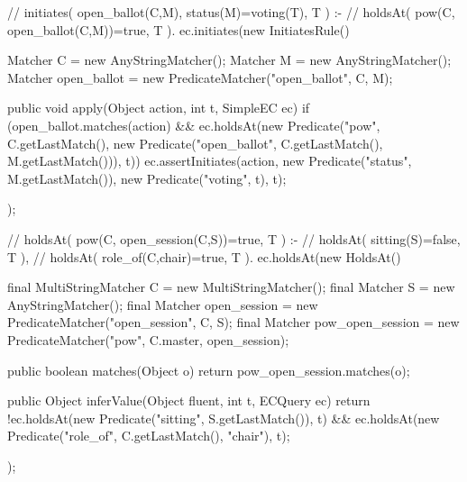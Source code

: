 \begin{java}[label=lst:initiates, caption={[Example of initiates rule]Example of initiates rule. Matchers are used to built a description of the event we wish to match. The matched arguments in this event are then used in the \emph{holdsAt} query to check whether the actor is empowered to perform the action. If the event and query are both valid we assert the change to the \emph{status} predicate.}]
// initiates( open_ballot(C,M), status(M)=voting(T), T ) :-
//     holdsAt( pow(C, open_ballot(C,M))=true, T ).
ec.initiates(new InitiatesRule() {
	Matcher C = new AnyStringMatcher();
	Matcher M = new AnyStringMatcher();
	Matcher open_ballot = new PredicateMatcher("open_ballot", C, M);

	public void apply(Object action, int t, SimpleEC ec) {
		if (open_ballot.matches(action)
				&& ec.holdsAt(new Predicate("pow", C.getLastMatch(),
						new Predicate("open_ballot", C.getLastMatch(),
								M.getLastMatch())), t)) {
			ec.assertInitiates(action,
					new Predicate("status", M.getLastMatch()),
					new Predicate("voting", t), t);
		}
	}
});
\end{java}

\begin{java}[label=lst:holdsAt,caption={[Example of \emph{holdsAt} rule]Example of \emph{holdsAt} rule. The \texttt{matches} function filters fluents which match the form we're looking for. If the fluent matches, \texttt{inferValue} determines the value based on the status of other fluents and using matched values from the specified fluent.}]
// holdsAt( pow(C, open_session(C,S))=true, T ) :-
//    holdsAt( sitting(S)=false, T ),
//    holdsAt( role_of(C,chair)=true, T ).
ec.holdsAt(new HoldsAt() {
	final MultiStringMatcher C = new MultiStringMatcher();
	final Matcher S = new AnyStringMatcher();
	final Matcher open_session = new PredicateMatcher("open_session",
			C, S);
	final Matcher pow_open_session = new PredicateMatcher("pow",
			C.master, open_session);

	public boolean matches(Object o) {
				return pow_open_session.matches(o);
			}

	public Object inferValue(Object fluent, int t, ECQuery ec) {
		return !ec.holdsAt(new Predicate("sitting", S.getLastMatch()), t)
				&& ec.holdsAt(new Predicate("role_of",
						C.getLastMatch(), "chair"), t);
	}
});
\end{java}

